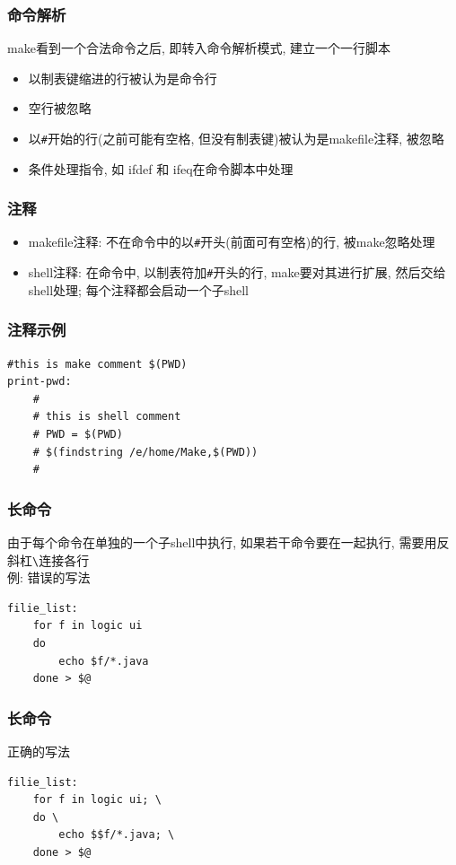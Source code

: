 \documentclass[compress]{beamer}
\begin{document}
\begin{frame}[containsverbatim]
\frametitle{命令解析}
make看到一个合法命令之后, 即转入命令解析模式, 建立一个一行脚本
\begin{itemize}
\item 以制表键缩进的行被认为是命令行
\item 空行被忽略
\item 以\verb~#~开始的行(之前可能有空格, 但没有制表键)被认为是makefile注释, 被忽略
\item 条件处理指令, 如 \alert{ifdef} 和 \alert{ifeq}在命令脚本中处理
\end{itemize}

\end{frame}

\begin{frame}[containsverbatim]
\frametitle{注释}
\begin{itemize}
\item makefile注释: 不在命令中的以\verb~#~开头(前面可有空格)的行, 被make忽略处理
\item shell注释: 在命令中, 以制表符加\verb~#~开头的行, make要对其进行扩展, 然后交给shell处理; 每个注释都会启动一个子shell
\end{itemize}
\end{frame}

\begin{frame}[containsverbatim]
  \frametitle{注释示例}

\begin{Verbatim}[showtabs=true]
#this is make comment $(PWD)
print-pwd:
	#
	# this is shell comment
	# PWD = $(PWD)
	# $(findstring /e/home/Make,$(PWD))
	#
\end{Verbatim}
\end{frame}

\begin{frame}[containsverbatim]
\frametitle{长命令}
由于每个命令在单独的一个子shell中执行, 如果若干命令要在一起执行, 需要用反斜杠\verb~\~连接各行\\

例: 错误的写法
\begin{Verbatim}[showtabs=true]
filie_list:
	for f in logic ui
	do
		echo $f/*.java
	done > $@
\end{Verbatim}
\end{frame}

\begin{frame}[containsverbatim]
\frametitle{长命令}
正确的写法
\begin{Verbatim}[showtabs=true]
filie_list:
	for f in logic ui; \
	do \
		echo $$f/*.java; \
	done > $@
\end{Verbatim}
\end{frame}
\end{document}
